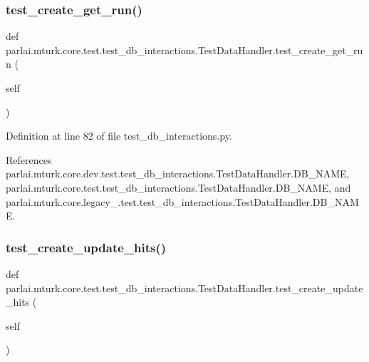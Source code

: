 \subsubsection{\texorpdfstring{test\+\_\+create\+\_\+get\+\_\+run()}{test\_create\_get\_run()}}
{\footnotesize\ttfamily def parlai.\+mturk.\+core.\+test.\+test\+\_\+db\+\_\+interactions.\+Test\+Data\+Handler.\+test\+\_\+create\+\_\+get\+\_\+run (\begin{DoxyParamCaption}\item[{}]{self }\end{DoxyParamCaption})}



Definition at line 82 of file test\+\_\+db\+\_\+interactions.\+py.



References parlai.\+mturk.\+core.\+dev.\+test.\+test\+\_\+db\+\_\+interactions.\+Test\+Data\+Handler.\+D\+B\+\_\+\+N\+A\+ME, parlai.\+mturk.\+core.\+test.\+test\+\_\+db\+\_\+interactions.\+Test\+Data\+Handler.\+D\+B\+\_\+\+N\+A\+ME, and parlai.\+mturk.\+core.\+legacy\+\_.\+test.\+test\+\_\+db\+\_\+interactions.\+Test\+Data\+Handler.\+D\+B\+\_\+\+N\+A\+ME.

\mbox{\label{classparlai_1_1mturk_1_1core_1_1test_1_1test__db__interactions_1_1TestDataHandler_a908018363b47f8e72677fbd0dc29a600}} 
\subsubsection{\texorpdfstring{test\+\_\+create\+\_\+update\+\_\+hits()}{test\_create\_update\_hits()}}
{\footnotesize\ttfamily def parlai.\+mturk.\+core.\+test.\+test\+\_\+db\+\_\+interactions.\+Test\+Data\+Handler.\+test\+\_\+create\+\_\+update\+\_\+hits (\begin{DoxyParamCaption}\item[{}]{self }\end{DoxyParamCaption})}



